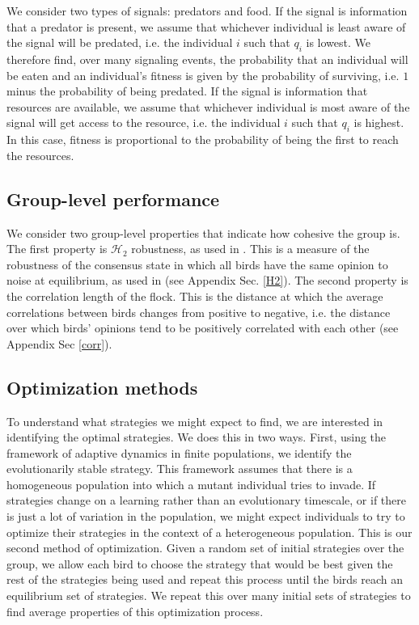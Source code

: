\documentclass{article}
\begin{document}
We consider two types of signals: predators and food.  If the signal is information that a predator is present, we assume that whichever individual is least aware of the signal will be predated, i.e. the individual $i$ such that $q_i$ is lowest.  We therefore find, over many signaling events, the probability that an individual will be eaten and an individual's fitness is given by the probability of surviving, i.e. $1$ minus the probability of being predated.  If the signal is information that resources are available, we assume that whichever individual is most aware of the signal will get access to the resource, i.e. the individual $i$ such that $q_i$ is highest. In this case, fitness is proportional to the probability of being the first to reach the resources. 

\subsection{Group-level performance }
We consider two group-level properties that indicate how cohesive the group is.  The first property is $\mathscr{H}_2$ robustness, as used in \cite{Young:2010fk,Young:2013kx}. This is a measure of the robustness of the consensus state in which all birds have the same opinion to noise at equilibrium, as used in (see Appendix Sec. \ref{H2}). The second property is the correlation length of the flock. This is the distance at which the average correlations between birds changes from positive to negative, i.e. the distance over which birds' opinions tend to be positively correlated with each other (see Appendix Sec \ref{corr}).

\subsection{Optimization methods }
To understand what strategies we might expect to find, we are interested in identifying the optimal strategies.  We does this in two ways.  First, using the framework of adaptive dynamics in finite populations, we identify the evolutionarily stable strategy.  This framework assumes that there is a homogeneous population into which a mutant individual tries to invade.  If strategies change on a learning rather than an evolutionary timescale, or if there is just a lot of variation in the population, we might expect individuals to try to optimize their strategies in the context of a heterogeneous population.  This is our second method of optimization. Given a random set of initial strategies over the group, we allow each bird to choose the strategy that would be best given the rest of the strategies being used and repeat this process until the birds reach an equilibrium set of strategies. We repeat this over many initial sets of strategies to find average properties of this optimization process.
\end{document}
